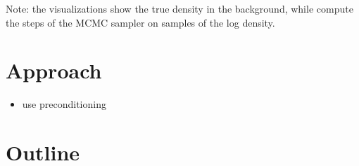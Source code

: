 Note: the visualizations show the true density in the background, while compute the steps of the MCMC sampler on samples of the log density.


\section{Approach}

\begin{itemize}
    \item use preconditioning
\end{itemize}




\section{Outline}

